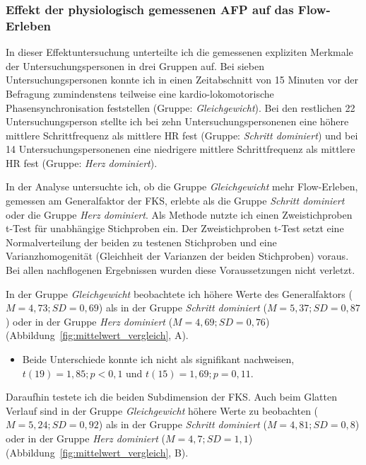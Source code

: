
\subsubsection{Effekt der physiologisch gemessenen AFP auf das Flow-Erleben} %
\label{ssub:effekt_der_physiologisch_gemessenen_afp}

In dieser Effektuntersuchung unterteilte ich die gemessenen expliziten Merkmale der Untersuchungspersonen in drei Gruppen auf. Bei sieben Untersuchungspersonen konnte ich in einen Zeitabschnitt von 15 Minuten vor der Befragung zumindenstens teilweise eine kardio-lokomotorische Phasensynchronisation feststellen (Gruppe: \emph{Gleichgewicht}). Bei den restlichen 22 Untersuchungsperson stellte ich bei zehn Untersuchungspersonenen eine höhere mittlere Schrittfrequenz als mittlere \ac{HR} fest (Gruppe: \emph{Schritt dominiert}) und bei 14 Untersuchungspersonenen eine niedrigere mittlere Schrittfrequenz als mittlere \ac{HR} fest (Gruppe: \emph{Herz dominiert}).

In der Analyse untersuchte ich, ob die Gruppe \emph{Gleichgewicht} mehr Flow-Erleben, gemessen am Generalfaktor der \ac{FKS}, erlebte als die Gruppe \emph{Schritt dominiert} oder die Gruppe \emph{Herz dominiert}. Als Methode nutzte ich einen Zweistichproben t-Test für unabhängige Stichproben ein. Der Zweistichproben t-Test setzt eine Normalverteilung der beiden zu testenen Stichproben und eine Varianzhomogenität (Gleichheit der Varianzen der beiden Stichproben) voraus. Bei allen nachflogenen Ergebnissen wurden diese Voraussetzungen nicht verletzt. 

In der Gruppe \emph{Gleichgewicht} beobachtete ich höhere Werte des Generalfaktors ($M = 4{,}73; SD = 0{,}69$) als in der Gruppe \emph{Schritt dominiert} ($M = 5{,}37; SD = 0{,}87$) oder in der Gruppe \emph{Herz dominiert} ($M = 4{,}69; SD = 0{,}76$) (Abbildung~\ref{fig:mittelwert_vergleich}, A). 

\begin{itemize}

	\item Beide Unterschiede konnte ich nicht als signifikant nachweisen, $t(19) = 1{,}85; p < 0{,}1$ und $t(15) = 1{,}69; p = 0{,}11$.

\end{itemize}

Daraufhin testete ich die beiden Subdimension der \ac{FKS}. Auch beim Glatten Verlauf sind in der Gruppe \emph{Gleichgewicht} höhere Werte zu beobachten ($M = 5{,}24; SD = 0{,}92$) als in der Gruppe \emph{Schritt dominiert} ($M = 4{,}81; SD = 0{,}8$) oder in der Gruppe \emph{Herz dominiert} ($M = 4{,}7; SD = 1{,}1$) (Abbildung~\ref{fig:mittelwert_vergleich}, B). 

